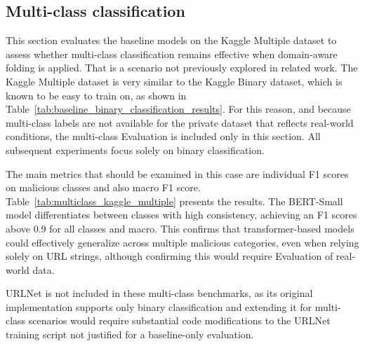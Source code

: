 \subsection{Multi-class classification}
\label{sec:multi_class_experiment}
This section evaluates the baseline models on the Kaggle Multiple dataset to assess whether multi-class classification remains effective when domain-aware folding is applied. That is a scenario not previously explored in related work. The Kaggle Multiple dataset is very similar to the Kaggle Binary dataset, which is known to be easy to train on, as shown in Table~\ref{tab:baseline_binary_classification_results}. For this reason, and because multi-class labels are not available for the private dataset that reflects real-world conditions, the multi-class Evaluation is included only in this section. All subsequent experiments focus solely on binary classification.

The main metrics that should be examined in this case are individual F1 scores on malicious classes and also macro F1 score. Table~\ref{tab:multiclass_kaggle_multiple} presents the results. The BERT-Small model differentiates between classes with high consistency, achieving an F1 scores above 0.9 for all classes and macro. This confirms that transformer-based models could effectively generalize across multiple malicious categories, even when relying solely on URL strings, although confirming this would require Evaluation of real-world data.

URLNet is not included in these multi-class benchmarks, as its original implementation supports only binary classification and extending it for multi-class scenarios would require substantial code modifications to the URLNet training script not justified for a baseline-only evaluation.

